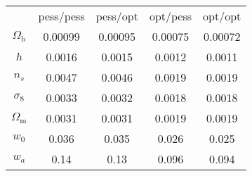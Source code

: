 \begin{table}
\centering
\begin{tabular}{|c|c|c|c|c|}
 & pess/pess & pess/opt & opt/pess & opt/opt \\
$\Omega_\mathrm{b}$ & 0.00099 & 0.00095 & 0.00075 & 0.00072 \\
$h$ & 0.0016 & 0.0015 & 0.0012 & 0.0011 \\
$n_s$ & 0.0047 & 0.0046 & 0.0019 & 0.0019 \\
$\sigma_8$ & 0.0033 & 0.0032 & 0.0018 & 0.0018 \\
$\Omega_\mathrm{m}$ & 0.0031 & 0.0031 & 0.0019 & 0.0019 \\
$w_0$ & 0.036 & 0.035 & 0.026 & 0.025 \\
$w_a$ & 0.14 & 0.13 & 0.096 & 0.094 \\
\end{tabular}
\end{table}
